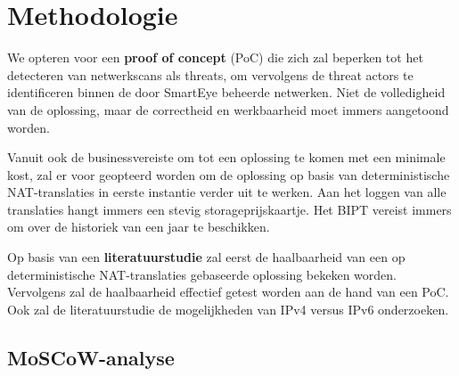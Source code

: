 \section{Methodologie}%
\label{sec:methodologie}

We opteren voor een \textbf{proof of concept} (PoC) die zich zal beperken tot het detecteren van netwerkscans als threats, om vervolgens de threat actors te identificeren binnen de door SmartEye beheerde netwerken. Niet de volledigheid van de oplossing, maar de correctheid en werkbaarheid moet immers aangetoond worden.

Vanuit ook de businessvereiste om tot een oplossing te komen met een minimale kost, zal er voor geopteerd worden om de oplossing op basis van deterministische NAT-translaties in eerste instantie verder uit te werken. Aan het loggen van alle translaties hangt immers een stevig storageprijskaartje. Het BIPT vereist immers om over de historiek van een jaar te beschikken.

Op basis van een \textbf{literatuurstudie} zal eerst de haalbaarheid van een op deterministische NAT-translaties gebaseerde oplossing bekeken worden. Vervolgens zal de haalbaarheid effectief getest worden aan de hand van een PoC. Ook zal de literatuurstudie de mogelijkheden van IPv4 versus IPv6 onderzoeken.

\subsection{MoSCoW-analyse}

